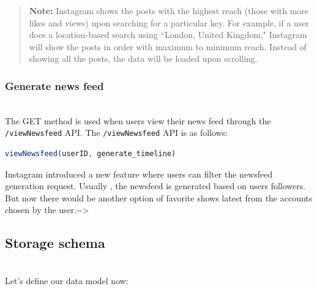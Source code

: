 \begin{quote}
\textbf{Note:} Instagram shows the posts with the highest reach (those with more likes and views) upon searching for a particular key. For example, if a user does a location-based search using ``London, United Kingdom," Instagram will show the posts in order with maximum to minimum reach. Instead of showing all the posts, the data will be loaded upon scrolling.
\end{quote}
\subsubsection{Generate news feed}\label{Vk5fD3v4xW0rBQaYKvbeG}
\\
The GET method is used when users view their news feed through the \texttt{/viewNewsfeed} API. The \texttt{/viewNewsfeed} API is as follows:

\begin{lstlisting}[language=JavaScript]
viewNewsfeed(userID, generate_timeline)
\end{lstlisting}

\begin{table}[htbp]
\centering
\small
{}
\end{table}

Instagram introduced a new feature where users can filter the newsfeed generation request. Usually , the newsfeed is generated based on users\textquotesingle{} followers. But now there would be another option of favorite shows latest from the accounts chosen by the user.-\/-\textgreater{}

\subsection{Storage schema}\label{h8cZIiLphLBKUOVECXE8N}
\\
Let's define our data model now:

